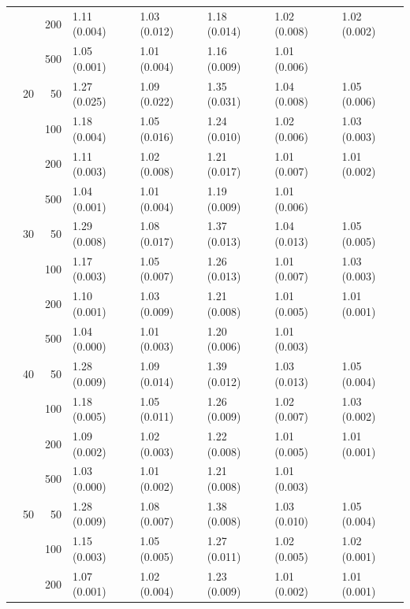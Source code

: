 \begin{longtable}{p{}lrlllll}
      &     & 200 &   1.11 (0.004) &   1.03 (0.012) &   1.18 (0.014) &         1.02 (0.008) &  1.02 (0.002) \\
      &     & 500 &   1.05 (0.001) &   1.01 (0.004) &   1.16 (0.009) &         1.01 (0.006) &            \\
      & 20  & 50  &   1.27 (0.025) &   1.09 (0.022) &   1.35 (0.031) &         1.04 (0.008) &  1.05 (0.006) \\
      &     & 100 &   1.18 (0.004) &   1.05 (0.016) &   1.24 (0.010) &         1.02 (0.006) &  1.03 (0.003) \\
      &     & 200 &   1.11 (0.003) &   1.02 (0.008) &   1.21 (0.017) &         1.01 (0.007) &  1.01 (0.002) \\
      &     & 500 &   1.04 (0.001) &   1.01 (0.004) &   1.19 (0.009) &         1.01 (0.006) &            \\
      & 30  & 50  &   1.29 (0.008) &   1.08 (0.017) &   1.37 (0.013) &         1.04 (0.013) &  1.05 (0.005) \\
      &     & 100 &   1.17 (0.003) &   1.05 (0.007) &   1.26 (0.013) &         1.01 (0.007) &  1.03 (0.003) \\
      &     & 200 &   1.10 (0.001) &   1.03 (0.009) &   1.21 (0.008) &         1.01 (0.005) &  1.01 (0.001) \\
      &     & 500 &   1.04 (0.000) &   1.01 (0.003) &   1.20 (0.006) &         1.01 (0.003) &            \\
      & 40  & 50  &   1.28 (0.009) &   1.09 (0.014) &   1.39 (0.012) &         1.03 (0.013) &  1.05 (0.004) \\
      &     & 100 &   1.18 (0.005) &   1.05 (0.011) &   1.26 (0.009) &         1.02 (0.007) &  1.03 (0.002) \\
      &     & 200 &   1.09 (0.002) &   1.02 (0.003) &   1.22 (0.008) &         1.01 (0.005) &  1.01 (0.001) \\
      &     & 500 &   1.03 (0.000) &   1.01 (0.002) &   1.21 (0.008) &         1.01 (0.003) &            \\
      & 50  & 50  &   1.28 (0.009) &   1.08 (0.007) &   1.38 (0.008) &         1.03 (0.010) &  1.05 (0.004) \\
      &     & 100 &   1.15 (0.003) &   1.05 (0.005) &   1.27 (0.011) &         1.02 (0.005) &  1.02 (0.001) \\
      &     & 200 &   1.07 (0.001) &   1.02 (0.004) &   1.23 (0.009) &         1.01 (0.002) &  1.01 (0.001) \\

\end{longtable}
